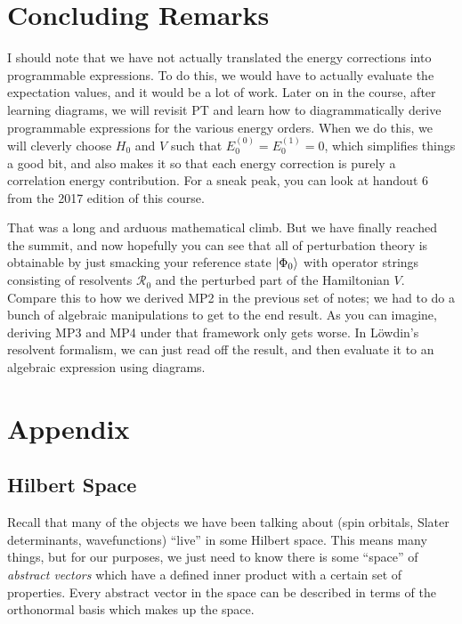 \documentclass{article}
\newcommand{\Rz}{\mathcal{R}_{0}}
\begin{document}
\section{Concluding Remarks}
I should note that we have not actually translated the energy corrections into 
programmable expressions. 
To do this, we would have to actually evaluate the expectation values, and it would 
be a lot of work.
Later on in the course, after learning diagrams, we will revisit PT and learn 
how to diagrammatically derive programmable expressions for the various energy orders.
When we do this, we will cleverly choose $H_0$ and $V$ such that $E_0^{(0)} = E_0^{(1)} = 0$,
which simplifies things a good bit, and also makes it so that each energy
correction is purely a correlation energy contribution. 
For a sneak peak, you can look at handout 6 from the 2017 edition of this course.


That was a long and arduous mathematical climb. But we have finally reached the summit,
and now hopefully you can see that all of perturbation theory is obtainable by just 
smacking your reference state $\ket{\Phi_0}$ with operator strings consisting 
of resolvents $\Rz$ and the perturbed part of the Hamiltonian $V$. 
Compare this to how we derived MP2 in the previous set of notes; we had to do a bunch of 
algebraic manipulations to get to the end result. 
As you can imagine, deriving MP3 and MP4 under that framework only gets worse. 
In L{\"o}wdin's resolvent formalism, we can just read off the result, 
    and then evaluate it to an algebraic expression using diagrams. 

\section{Appendix}
\subsection{Hilbert Space}
Recall that many of the objects we have been talking about (spin orbitals, Slater determinants, wavefunctions)
``live'' in some Hilbert space. This means many things, but for our purposes, we just need to know
there is some ``space'' of \textit{abstract vectors} which have a defined inner product with a certain set of properties.
Every abstract vector in the space can be described in terms of the orthonormal basis which makes up the space. 
\end{document}

